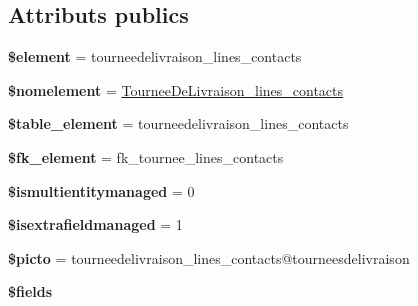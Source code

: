 \subsection*{Attributs publics}
\begin{DoxyCompactItemize}
\item 
\mbox{\label{classTourneeDeLivraison__lines__contacts_ace247ba3ac01ec72b4c0562cb930cae7}} 
{\bfseries \$element} = \textquotesingle{}tourneedelivraison\+\_\+lines\+\_\+contacts\textquotesingle{}
\item 
\mbox{\label{classTourneeDeLivraison__lines__contacts_a61b5fcbdfc9eb383620ddb4c3a571b72}} 
{\bfseries \$nomelement} = \textquotesingle{}\hyperlink{classTourneeDeLivraison__lines__contacts}{Tournee\+De\+Livraison\+\_\+lines\+\_\+contacts}\textquotesingle{}
\item 
\mbox{\label{classTourneeDeLivraison__lines__contacts_a4f06a58be0152fb76fc7212de76e643d}} 
{\bfseries \$table\+\_\+element} = \textquotesingle{}tourneedelivraison\+\_\+lines\+\_\+contacts\textquotesingle{}
\item 
\mbox{\label{classTourneeDeLivraison__lines__contacts_ae9c51ff034d047a757377189e9efaa3d}} 
{\bfseries \$fk\+\_\+element} = \textquotesingle{}fk\+\_\+tournee\+\_\+lines\+\_\+contacts\textquotesingle{}
\item 
\mbox{\label{classTourneeDeLivraison__lines__contacts_a547caa4e1aa856999e4b7c4925e3e593}} 
{\bfseries \$ismultientitymanaged} = 0
\item 
\mbox{\label{classTourneeDeLivraison__lines__contacts_aac6843f6bd5d4198a0432f19f9eef2e7}} 
{\bfseries \$isextrafieldmanaged} = 1
\item 
\mbox{\label{classTourneeDeLivraison__lines__contacts_a8f09e2d7111083930a1d6ec61b59deb6}} 
{\bfseries \$picto} = \textquotesingle{}tourneedelivraison\+\_\+lines\+\_\+contacts@tourneesdelivraison\textquotesingle{}
\item 
{\bfseries \$fields}

\end{DoxyCompactItemize}
